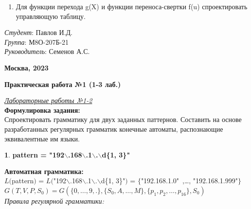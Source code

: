 \documentclass[a4paper,10pt]{article}
\begin{document}
\begin{titlepage}
\begin{enumerate}
			\item Для функции перехода g(X) и функции переноса-свертки f(u) спроектировать управляющую таблицу.
		\end{enumerate}
		\vfill
		\hfill
		\begin{minipage}{.3\textwidth}
			\textit{Студент}: Павлов И.Д.\\
			\textit{Группа}: М8О-207Б-21\\
			\textit{Руководитель}: Семенов А.С.
		\end{minipage}%
		\vfill
		\begin{center}
			\textbf{Москва, 2023}
		\end{center}
	\end{titlepage}
	
	\newpage
	
	\begin{center}
		\textbf{Практическая работа №1 (1-3 лаб.)}
	\end{center}
	\underline{\textit{Лабораторные работы №1-2}} \\[5mm]
	\textbf{Формулировка задания:} \\[3mm]
	\hspace*{5mm} Спроектировать грамматику для двух заданных паттернов. Составить на основе разработанных регулярных грамматик конечные автоматы, распознающие эквивалентные им языки. \\
	\begin{center}
		\textbf{1}. \textbf{pattern = "192$\backslash$.168$\backslash$.1$\backslash$.$\backslash$d\{1, 3\}" }
	\end{center}
	\textbf{Автоматная грамматика:} \\[3mm]
	\hspace*{5mm} $L($pattern$)$ = $L($"192$\backslash$.168$\backslash$.1$\backslash$.$\backslash$d\{1, 3\}"$)$ = $\{$"192.168.1.0"\ ,\dots, "192.168.1.999"$\}$ \\
	\hspace*{5mm} $G(T, V, P, S_0) = G(\{0, \dots, 9, .\}, \{S_0, A, \dots, M\}, \{p_1, p_2, \dots, p_{16}\}, S_0)$ \\[5mm]
	\textit{Правила регулярной грамматики:}
\end{document}
